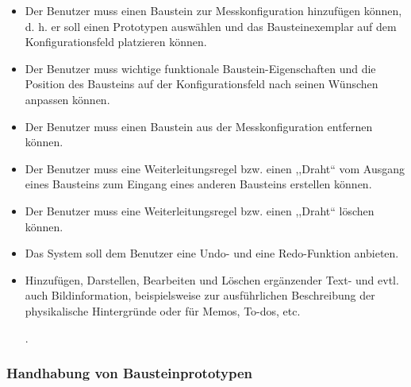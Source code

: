 \documentclass[parskip=full]{scrartcl}
\begin{document}
\begin{itemize}
	
	\item 
	\begin{MussKrit} 			
		Der Benutzer muss einen Baustein zur Messkonfiguration hinzufügen können, d. h. er soll einen Prototypen auswählen und das Bausteinexemplar auf dem Konfigurationsfeld platzieren können. 
	\end{MussKrit}
	
	\item 
	\begin{MussKrit} 		
		Der Benutzer muss wichtige funktionale Baustein-Eigenschaften und die Position des Bausteins auf der Konfigurationsfeld nach seinen Wünschen anpassen können.
	\end{MussKrit}
	
	\item 
	\begin{MussKrit} 			
		Der Benutzer muss einen Baustein aus der Messkonfiguration entfernen können.
	\end{MussKrit}
	
	\item 
	\begin{MussKrit} 			
		Der Benutzer muss eine Weiterleitungsregel bzw. einen ,,Draht`` vom Ausgang eines Bausteins zum Eingang eines anderen Bausteins erstellen können.
	\end{MussKrit}
	
	\item 
	\begin{MussKrit} 			
		Der Benutzer muss eine Weiterleitungsregel bzw. einen ,,Draht`` löschen können.
	\end{MussKrit}
	
	\item 
	\begin{SollKrit} 			
		Das System soll dem Benutzer eine Undo- und eine Redo-Funktion anbieten.
	\end{SollKrit}
			
	\item 
	\begin{WunschKrit} 
		Hinzufügen, Darstellen, Bearbeiten und Löschen ergänzender Text- und evtl. auch Bildinformation, beispielsweise zur ausführlichen Beschreibung der physikalische Hintergründe oder für Memos, To-dos, etc.
	\end{WunschKrit}.
	
\end{itemize}

\subsubsection{Handhabung von Bausteinprototypen}
\end{document}
